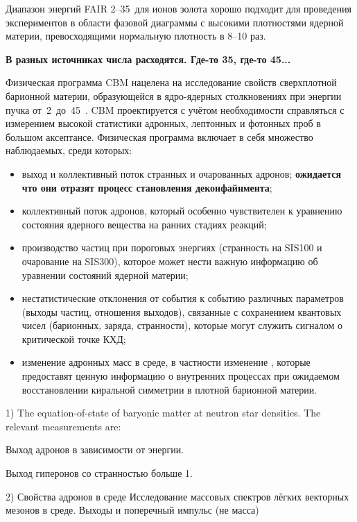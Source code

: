 Диапазон энергий FAIR 2--35~\GeVperNucl для ионов золота хорошо подходит для проведения экспериментов в области фазовой диаграммы с высокими плотностями ядерной материи, превосходящими нормальную плотность в 8--10 раз.

\todo \textbf{В разных источниках числа расходятся. Где-то 35, где-то 45...}

Физическая программа CBM нацелена на исследование свойств сверхплотной барионной материи, образующейся в ядро-ядерных столкновениях при энергии пучка от~2~до~45~\GeVperNucl. CBM проектируется с учётом необходимости справляться с измерением высокой статистики адронных, лептонных и фотонных проб в большом аксептансе. Физическая программа включает в себя множество наблюдаемых, среди которых:

\begin{itemize}
\item выход и коллективный поток странных и очарованных адронов; \textbf{ожидается что они отразят процесс становления деконфайнмента};
\item коллективный поток адронов, который особенно чувствителен к уравнению состояния ядерного вещества на ранних стадиях реакций;
\item производство частиц при пороговых энергиях (странность на SIS100 и очарование на SIS300), которое может нести важную информацию об уравнении состояний ядерной материи;
\item нестатистические отклонения от события к событию различных параметров (выходы частиц, отношения выходов), связанные с сохранением квантовых чисел (барионных, заряда, странности), которые могут служить сигналом о критической точке КХД;
\item изменение адронных масс в среде, в частности изменение \todo, которые предоставят ценную информацию о внутренних процессах при ожидаемом восстановлении киральной симметрии в плотной барионной материи.
\end{itemize}


1) The equation-of-state of baryonic matter at neutron star densities.
The relevant measurements are:

Выход адронов в зависимости от энергии.

Выход гиперонов со странностью больше 1.


2) Свойства адронов в среде
Исследование массовых спектров лёгких векторных мезонов в среде.
Выходы и поперечный импульс (не масса) 


